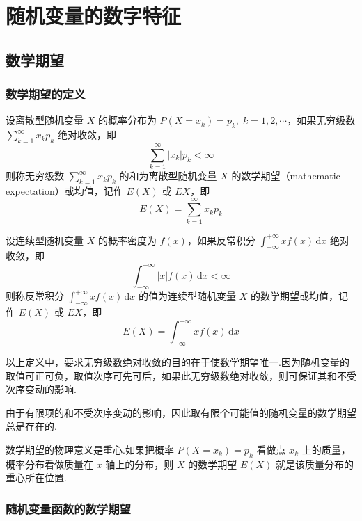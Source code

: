 
\chapter{随机变量的数字特征}

\section{数学期望}

\subsection{数学期望的定义}

\begin{definition}
    \indent 设离散型随机变量 $X$ 的概率分布为 $P(X=x_k) = p_k, \; k=1,2,\cdots$，如果无穷级数 $\displaystyle\sum_{k=1}^{\infty} x_k p_k$ 绝对收敛，即
    $$
    \sum_{k=1}^{\infty} |x_k| p_k < \infty
    $$
    则称无穷级数 $\displaystyle\sum_{k=1}^{\infty} x_k p_k$ 的和为离散型随机变量 $X$ 的{\heiti 数学期望}（mathematic expectation）或{\heiti 均值}，记作 $E(X)$ 或 $EX$，即
    $$
    E(X) = \sum_{k=1}^{\infty} x_k p_k
    $$

    设连续型随机变量 $X$ 的概率密度为 $f(x)$，如果反常积分 $\displaystyle\int_{-\infty}^{+\infty} x f(x) \, \text{d}x$ 绝对收敛，即
    $$
    \int_{-\infty}^{+\infty} |x| f(x) \, \text{d}x < \infty
    $$
    则称反常积分 $\displaystyle\int_{-\infty}^{+\infty} x f(x) \, \text{d}x$ 的值为连续型随机变量 $X$ 的{\heiti 数学期望}或{\heiti 均值}，记作 $E(X)$ 或 $EX$，即
    $$
    E(X) = \int_{-\infty}^{+\infty} x f(x) \, \text{d}x
    $$
\end{definition}

\begin{note}
    \indent 以上定义中，要求无穷级数绝对收敛的目的在于使数学期望唯一.因为随机变量的取值可正可负，取值次序可先可后，如果此无穷级数绝对收敛，则可保证其和不受次序变动的影响.

    由于有限项的和不受次序变动的影响，因此取有限个可能值的随机变量的数学期望总是存在的.
\end{note}

数学期望的物理意义是重心.如果把概率 $P(X=x_k) = p_k$ 看做点 $x_k$ 上的质量，概率分布看做质量在 $x$ 轴上的分布，则 $X$ 的数学期望 $E(X)$ 就是该质量分布的重心所在位置.

\subsection{随机变量函数的数学期望}

